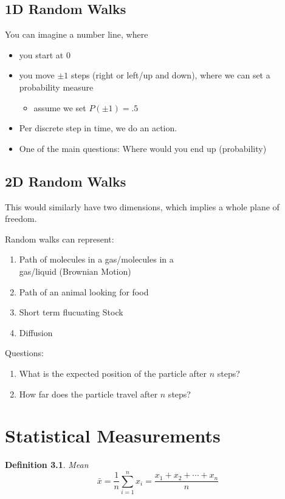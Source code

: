 \documentclass[12pt]{book}
\newtheorem*{definition*}{Definition}
\begin{document}
\section{1D Random Walks}
You can imagine a number line, where 
\begin{itemize}
\item you start at 0
\item you move $\pm 1$ steps (right or left/up and down), where we can set a probability measure
	\begin{itemize}
	\item assume we set $P(\pm 1)=.5$
	\end{itemize}
\item Per discrete step in time, we do an action. 
\item One of the main questions: Where would you end up (probability)
\end{itemize}



\section{2D Random Walks}

\hspace{\parindent}This would similarly have two dimensions, which implies a whole plane of freedom.

\noindent Random walks can represent: 
\begin{enumerate}
\item Path of molecules in a gas/molecules in a \\gas/liquid (Brownian Motion)
\item Path of an animal looking for food
\item Short term flucuating Stock
\item Diffusion 
\end{enumerate}

\noindent Questions:
\begin{enumerate}
\item What is the expected position of the particle after $n$ steps?
\item How far does the particle travel after $n$ steps?
\end{enumerate}










\chapter{Statistical Measurements}
\begin{definition*}Mean
$$\bar{x}=\frac{1}{n} \sum\limits_{i=1}^{n} x_{i}=\frac{x_{1}+x_{2}+\cdots+x_{n}}{n}$$
\end{definition*}
\end{document}
